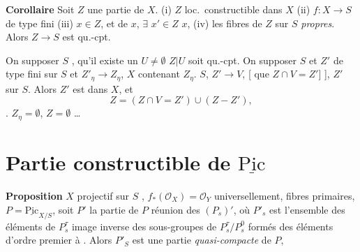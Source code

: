 \documentclass[11pt,a4paper]{article}
\begin{document}
\textbf{Corollaire} \quad Soit $Z$ une partie de $X$. \ill{}  (i) $Z$ loc.\ constructible dans $X$ (ii) $f : X \to S$   de type fini (iii)  \ill{} $x \in Z$, et \ill{}  de $x$, $\exists$ \ill{} $x' \in Z$ \ill{} $x$, \ill{} \ill{} \ill{}  (iv) les fibres de $Z$ sur $S$ \ill{} \emph{propres}. Alors $Z \to S$ est
qu.-cpt.

On  supposer $S$ , \ill{} \ill{} \ill{}  qu'il existe un \ill{} $U \neq \emptyset$ \ill{} $Z|U$ soit qu.-cpt. On  supposer $S$ \ill{} \ill{} et \ill{} $Z'$ de type fini sur $S$ et \ill{} \ill{}
\ill{} $Z'_\eta \to Z_\eta$, \ill{} $X$ contenant $Z_\eta$.  $S$,
\ill{} \ill{} \ill{} $Z' \to V$, [\ill{} \ill{} que $Z \cap V = Z'$]
\ill{} ], \ill{} $Z'$ \ill{}  sur $S$.
Alors $Z'$ est  dans $X$, et \ill{} \ill{}
\[
  Z = (Z \cap V = Z') \cup (Z - Z'),
\]
 \ill{} \ill{} . \ill{} \ill{}
\ill{} \ill{} \ill{} $Z_\eta = \emptyset$,
\ill{} \ill{} $Z = \emptyset$ …


\section{Partie constructible de $\underline{\mathrm{Pic}}$}

\textbf{Proposition} \quad $X$ projectif sur $S$ , $f_*(\mathcal{O}_X) = \mathcal{O}_Y$ universellement, fibres primaires, $P = \underline{\mathrm{Pic}}_{X/S}$, soit $P'$ la partie de $P$ réunion des $(P_s)'$, où $P'_s$ est l'ensemble des éléments de $P_s^\tau$ image inverse des sous-groupes de $P_s^\tau / P_s^0$ formés des éléments d'ordre premier à \struck{\ill{}} .
 
Alors $P'_S$ est une partie   \emph{quasi-compacte} de $P$, \struck{\ill{}}
\end{document}
